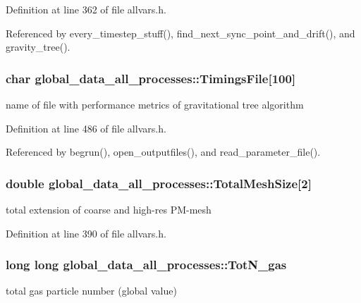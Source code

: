 Definition at line 362 of file allvars.h.



Referenced by every\_\-timestep\_\-stuff(), find\_\-next\_\-sync\_\-point\_\-and\_\-drift(), and gravity\_\-tree().

\hypertarget{structglobal__data__all__processes_ae0f7c691d211f8076374cc55271022e8}{
\subsubsection[{TimingsFile}]{\setlength{\rightskip}{0pt plus 5cm}char {\bf global\_\-data\_\-all\_\-processes::TimingsFile}\mbox{[}100\mbox{]}}}
\label{structglobal__data__all__processes_ae0f7c691d211f8076374cc55271022e8}
name of file with performance metrics of gravitational tree algorithm 

Definition at line 486 of file allvars.h.



Referenced by begrun(), open\_\-outputfiles(), and read\_\-parameter\_\-file().

\hypertarget{structglobal__data__all__processes_a1d2411089720f3ad0b8a294f5a693475}{
\subsubsection[{TotalMeshSize}]{\setlength{\rightskip}{0pt plus 5cm}double {\bf global\_\-data\_\-all\_\-processes::TotalMeshSize}\mbox{[}2\mbox{]}}}
\label{structglobal__data__all__processes_a1d2411089720f3ad0b8a294f5a693475}
total extension of coarse and high-\/res PM-\/mesh 

Definition at line 390 of file allvars.h.

\hypertarget{structglobal__data__all__processes_a2bb70816a4d5f56e0df2d9b8d706cef2}{
\subsubsection[{TotN\_\-gas}]{\setlength{\rightskip}{0pt plus 5cm}long long {\bf global\_\-data\_\-all\_\-processes::TotN\_\-gas}}}
\label{structglobal__data__all__processes_a2bb70816a4d5f56e0df2d9b8d706cef2}
total gas particle number (global value) 

